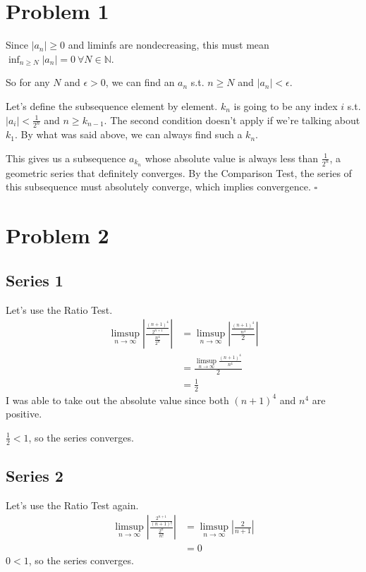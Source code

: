 \documentclass[12pt]{article}
\newcommand{\N}{\mathbb{N}}
\begin{document}
\section{Problem 1}

Since $|a_n| \ge 0$ and liminfs are nondecreasing,
this must mean $\inf_{n \ge N} |a_n|=0\ \forall N \in \N$.

So for any $N$ and $\epsilon > 0$, we can find an $a_n$ s.t. $n \ge N$ and $|a_n| < \epsilon$.

Let's define the subsequence element by element.
$k_n$ is going to be any index $i$ s.t. $|a_i| < \frac{1}{2^n}$ and $n \ge k_{n-1}$.
The second condition doesn't apply if we're talking about $k_1$.
By what was said above, we can always find such a $k_n$.

This gives us a subsequence $a_{k_n}$ whose absolute value is always
less than $\frac{1}{2^n}$, a geometric series that definitely converges.
By the Comparison Test, the series of this subsequence must
absolutely converge, which implies convergence. $\square$

\section{Problem 2}

\subsection{Series 1}

Let's use the Ratio Test.
\begin{align*}
  \limsup_{n \to \infty} \left|\frac{\frac{(n+1)^4}{2^{n+1}}}{\frac{n^4}{2^n}}\right|
   & = \limsup_{n \to \infty} \left|\frac{\frac{(n+1)^4}{n^4}}{2}\right| \\
   & = \frac{\limsup_{n \to \infty} \frac{(n+1)^4}{n^4}}{2}              \\
   & = \frac{1}{2}
\end{align*}
I was able to take out the absolute value since both $(n+1)^4$ and $n^4$ are positive.

$\frac{1}{2}<1$, so the series converges.

\subsection{Series 2}

Let's use the Ratio Test again.
\begin{align*}
  \limsup_{n \to \infty} \left|\frac{\frac{2^{n+1}}{(n+1)!}}{\frac{2^n}{n!}}\right|
   & = \limsup_{n \to \infty} \left|\frac{2}{n+1}\right| \\
   & = 0
\end{align*}
$0 < 1$, so the series converges.
\end{document}
